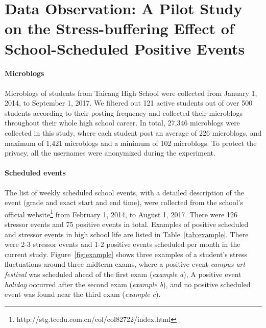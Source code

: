 \documentclass[5p,times,numbers,authoryear]{elsarticle}
\begin{document}
\section{Data Observation: A Pilot Study on the Stress-buffering Effect of School-Scheduled Positive Events}
\label{sec:obs}
\paragraph{Microblogs} Microblogs of students from Taicang High School were collected from January 1, 2014, to September 1, 2017.
We filtered out 121 active students out of over 500 students according to their posting frequency
and collected their microblogs throughout their whole high school career.
In total, 27,346 microblogs were collected in this study, where each student post an average of 226 microblogs, and maximum of 1,421 microblogs and a minimum of 102 microblogs.
To protect the privacy, all the usernames were anonymized during the experiment.

\paragraph{Scheduled events} The list of weekly scheduled school events,
with a detailed description of the event (grade and exact start and end time),
were collected from the school's official website\footnote{http://stg.tcedu.com.cn/col/col82722/index.html} from February 1, 2014, to August 1, 2017.
There were 126 stressor events and 75 positive events in total.
Examples of positive scheduled  and stressor events in high school life are listed in Table~\ref{tab:example}.
There were 2-3 stressor events and 1-2 positive events scheduled per month in the current study.
Figure~\ref{fig:example} shows three examples of a student's stress fluctuations around three midterm exams, where a positive event \emph{campus art festival} was scheduled ahead of the first exam (\emph{example a}),
A positive event \emph{holiday} occurred after the second exam (\emph{example b}),
and no positive scheduled event was found near the third exam (\emph{example c}).


\begin{table}[H]
\caption{\small{Examples of school-scheduled positive and stressor events.}}
\label{tab:example}
\end{table}
\end{document}

